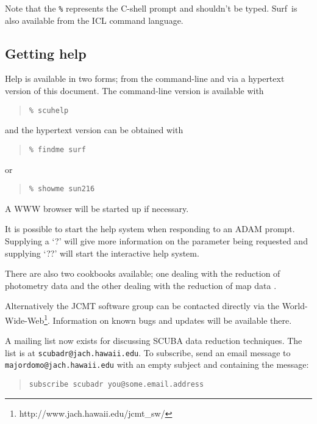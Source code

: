 \documentclass[twoside,11pt]{article}
\newcommand{\scusoft}          {{\sc Surf}}
\newenvironment{myquote}{\begin{quote}\begin{small}}{\end{small}\end{quote}}
\newcommand{\htmladdnormallinkfoot}[2]{#1\footnote{#2}}
\newcommand{\htmladdnormallink}[2]{#1}
\begin{document}
Note that the \texttt{\%} represents the C-shell prompt and shouldn't be typed.
\scusoft\ is also available from the ICL command language.


\subsection{Getting help}

Help is available in two forms; from the command-line and via a hypertext 
version of this document. The command-line version is available with

\begin{myquote}
\begin{verbatim}
% scuhelp
\end{verbatim}
\end{myquote}

and the hypertext version can be obtained with

\begin{myquote}
\begin{verbatim}
% findme surf
\end{verbatim}
\end{myquote}
or
\begin{myquote}
\begin{verbatim}
% showme sun216
\end{verbatim}
\end{myquote}
A WWW browser will be started up if necessary.

It is possible to start the help system when responding to
an ADAM prompt. Supplying a `?' will give more information on the
parameter being requested and supplying `??' will start the interactive
help system.

There are also two cookbooks available; one dealing with the reduction of
photometry data \cite{S97} and the other dealing with the reduction of
map data \cite{SANDELL97}.

Alternatively the JCMT software group can be contacted directly via the
\htmladdnormallinkfoot{World-Wide-Web}{http://www.jach.hawaii.edu/jcmt\_sw/}.
Information on known bugs and updates will be available there.

A mailing list now exists for discussing SCUBA data reduction techniques.  The
list is at
\htmladdnormallink{\texttt{scubadr@jach.hawaii.edu}}{mailto:scubadr@jach.hawaii.edu}. To
subscribe, send an email message to
\htmladdnormallink{\texttt{majordomo@jach.hawaii.edu}}{mailto:majordomo@jach.hawaii.edi}
with an empty subject and containing the message:
\begin{myquote}
\begin{verbatim}
subscribe scubadr you@some.email.address
\end{verbatim}
\end{myquote}
\end{document}
